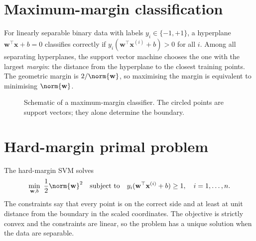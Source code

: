 \documentclass[a4paper, 12pt]{book}
\begin{document}
\section{Maximum-margin classification}

For linearly separable binary data with labels $y_i \in \{-1,+1\}$, a hyperplane
$\mathbf{w}^\top\mathbf{x}+b=0$ classifies correctly if
$y_i(\mathbf{w}^\top\mathbf{x}^{(i)}+b) > 0$ for all $i$. Among all separating
hyperplanes, the support vector machine chooses the one with the largest \emph{margin}:
the distance from the hyperplane to the closest training points. The geometric margin
is $2/\norm{\mathbf{w}}$, so maximising the margin is equivalent to minimising
$\norm{\mathbf{w}}$.

\begin{figure}[htbp]
\centering
{}
\caption{Schematic of a maximum-margin classifier. The circled points are support
vectors; they alone determine the boundary.}
\label{fig:svm}
\end{figure}

\section{Hard-margin primal problem}

The hard-margin SVM solves
\begin{align}
    \min_{\mathbf{w},b}\ \frac{1}{2}\norm{\mathbf{w}}^2
    \quad \text{subject to} \quad
    y_i(\mathbf{w}^\top\mathbf{x}^{(i)}+b) \geq 1, \quad i=1,\ldots,n.
\end{align}
The constraints say that every point is on the correct side and at least at unit
distance from the boundary in the scaled coordinates. The objective is strictly convex
and the constraints are linear, so the problem has a unique solution when the data are
separable.
\end{document}
